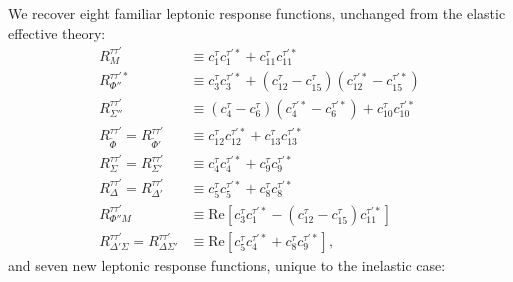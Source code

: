 \documentclass[12pt,letterpaper]{book}
\begin{document}
We recover eight familiar leptonic response functions, unchanged from the elastic effective theory:
\begin{equation}
\begin{split}
R_M^{\tau\tau'}&\equiv c_1^{\tau}c_1^{\tau'*}+c_{11}^{\tau}c_{11}^{\tau'*}\\
R_{\Phi''}^{\tau\tau'*}&\equiv c_3^{\tau}c_3^{\tau'*}+(c_{12}^{\tau}-c_{15}^{\tau})(c_{12}^{\tau'*}-c_{15}^{\tau'*})\\
R_{\Sigma''}^{\tau\tau'}&\equiv(c_4^{\tau}-c_6^{\tau})(c_4^{\tau'*}-c_6^{\tau'*})+c_{10}^{\tau}c_{10}^{\tau'*}\\
R_{\tilde{\Phi}}^{\tau\tau'}=R_{\tilde{\Phi}'}^{\tau\tau'}&\equiv c_{12}^{\tau}c_{12}^{\tau'*}+c_{13}^{\tau}c_{13}^{\tau'*}\\
R_{\Sigma}^{\tau\tau'}=R_{\Sigma'}^{\tau\tau'}&\equiv c_4^{\tau}c_4^{\tau'*}+c_9^{\tau}c_9^{\tau'*}\\
R_{\Delta}^{\tau\tau'}=R_{\Delta'}^{\tau\tau'}&\equiv c_5^{\tau}c_5^{\tau'*}+c_8^{\tau}c_8^{\tau'*}\\
R_{\Phi''M}^{\tau\tau'}&\equiv \mathrm{Re}\left[c_3^{\tau}c_1^{\tau'*}-(c_{12}^{\tau}-c_{15}^{\tau})c_{11}^{\tau'*}\right]\\
R_{\Delta'\Sigma}^{\tau\tau'}=R_{\Delta\Sigma'}^{\tau\tau'}&\equiv \mathrm{Re}\left[c_5^{\tau}c_4^{\tau'*}+c_8^{\tau}c_9^{\tau'*}\right],
\end{split}
\end{equation}
and seven new leptonic response functions, unique to the inelastic case:
\end{document}
